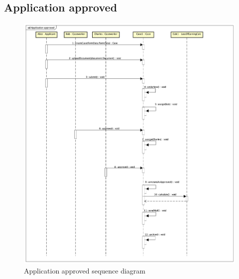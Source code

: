\subsection{Application approved}
\begin{figure}[htb!]
    \centering
    \includegraphics[width=\textwidth]{img/sd-application-approved.png}
    \caption{Application approved sequence diagram}
    \label{fig:my_label}
\end{figure}

\newpage
